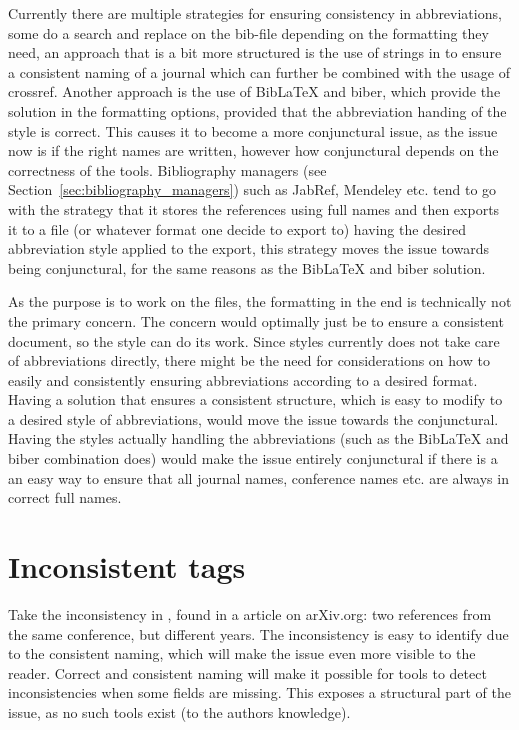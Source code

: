 Currently there are multiple strategies for ensuring consistency in
abbreviations, some do a search and replace on the bib-file depending
on the formatting they need, an approach that is a bit more structured
is the use of strings in {\bibtex} to ensure a consistent naming of a
journal which can further be combined with the usage of crossref.
Another approach is the use of Bib{\LaTeX} and biber, which provide
the solution in the formatting
options\cite{koppensteiner2011abbreviate}, provided that the
abbreviation handing of the style is correct.  This causes it to
become a more conjunctural issue, as the issue now is if the right
names are written, however how conjunctural depends on the correctness
of the tools.  Bibliography managers (see
Section~\ref{sec:bibliography_managers}) such as JabRef, Mendeley
etc. tend to go with the strategy that it stores the references using
full names and then exports it to a {\bibtex} file (or whatever format
one decide to export to) having the desired abbreviation style applied
to the export, this strategy moves the issue towards being
conjunctural, for the same reasons as the Bib{\LaTeX} and biber
solution.

As the purpose is to work on the {\bibtex} files, the formatting in
the end is technically not the primary concern.  The concern would
optimally just be to ensure a consistent document, so the style can do
its work.  Since {\bibtex} styles currently does not take care of
abbreviations directly, there might be the need for considerations on
how to easily and consistently ensuring abbreviations according to a
desired format.  Having a solution that ensures a consistent
structure, which is easy to modify to a desired style of
abbreviations, would move the issue towards the conjunctural.  Having
the styles actually handling the abbreviations (such as the
Bib{\LaTeX} and biber combination does) would make the issue entirely
conjunctural if there is a an easy way to ensure that all journal
names, conference names etc. are always in correct full names.

\section{Inconsistent tags}
\label{sec:problems_inconsistent_tags}

Take the inconsistency in , found in a
article on arXiv.org: two references from the same conference, but
different years.  The inconsistency is easy to identify due to the
consistent naming, which will make the issue even more visible to the
reader.  Correct and consistent naming will make it possible for tools
to detect inconsistencies when some fields are missing.  This exposes
a structural part of the issue, as no such tools exist (to the
authors knowledge).


